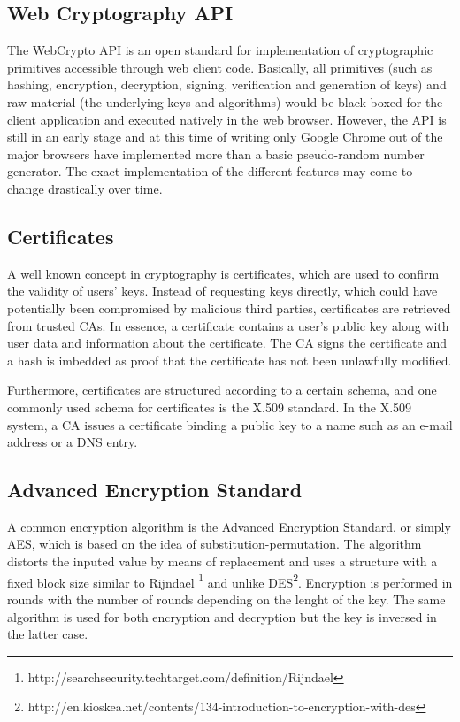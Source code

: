 \subsection{Web Cryptography API}
The WebCrypto API is an open standard for implementation of cryptographic primitives accessible through web client code\cite{WebCrypto:Online}. Basically, all primitives (such as hashing, encryption, decryption, signing, verification and generation of keys) and raw material (the underlying keys and algorithms) would be black boxed for the client application and executed natively in the web browser. However, the API is still in an early stage and at this time of writing only Google Chrome out of the major browsers have implemented more than a basic pseudo-random number generator. The exact implementation of the different features may come to change drastically over time.

\subsection{Certificates}
A well known concept in cryptography is certificates, which are used to confirm the validity of users' keys\cite{EETimesCrypto:Online}. Instead of requesting keys directly, which could have potentially been compromised by malicious third parties, certificates are retrieved from trusted CAs. In essence, a certificate contains a user's public key along with user data and information about the certificate. The CA signs the certificate and a hash is imbedded as proof that the certificate has not been unlawfully modified.

Furthermore, certificates are structured according to a certain schema, and one commonly used schema for certificates is the X.509 standard\cite{IETFX509:Online}. In the X.509 system, a CA issues a certificate binding a public key to a name such as an e-mail address or a DNS entry.

\subsection{Advanced Encryption Standard}

A common encryption algorithm is the Advanced Encryption Standard, or simply AES, which is based on the idea of substitution-permutation\cite{AESISFAST:Online}. The algorithm distorts the inputed value by means of replacement and uses a structure with a fixed block size similar to Rijndael \footnote{http://searchsecurity.techtarget.com/definition/Rijndael} and unlike DES\footnote{http://en.kioskea.net/contents/134-introduction-to-encryption-with-des}. Encryption is performed in rounds with the number of rounds depending on the lenght of the key. The same algorithm is used for both encryption and decryption but the key is inversed in the latter case.

